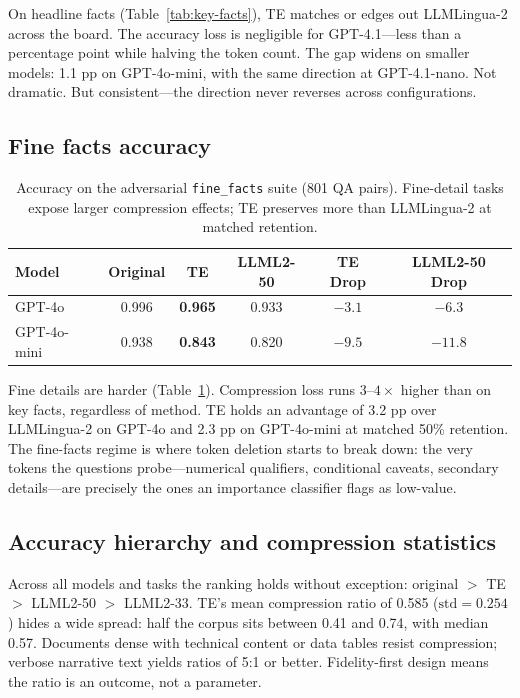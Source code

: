 \documentclass{article}
\begin{document}
On headline facts (Table~\ref{tab:key-facts}), TE matches or edges out LLMLingua-2 across the board. The accuracy loss is negligible for GPT-4.1---less than a percentage point while halving the token count. The gap widens on smaller models: 1.1 pp on GPT-4o-mini, with the same direction at GPT-4.1-nano. Not dramatic. But consistent---the direction never reverses across configurations.

\subsection{Fine facts accuracy}

\begin{table}[h]
  \caption{Accuracy on the adversarial \texttt{fine\_facts} suite (801 QA pairs). Fine-detail tasks expose larger compression effects; TE preserves more than LLMLingua-2 at matched retention.}
  \label{tab:fine-facts}
  \centering
  \small
  \begin{tabular}{lccccc}
    \toprule
    Model & Original & TE & LLML2-50 & TE Drop & LLML2-50 Drop \\
    \midrule
    GPT-4o      & 0.996 & \textbf{0.965} & 0.933 & $-3.1$ & $-6.3$ \\
    GPT-4o-mini & 0.938 & \textbf{0.843} & 0.820 & $-9.5$ & $-11.8$ \\
    \bottomrule
  \end{tabular}
\end{table}

Fine details are harder (Table~\ref{tab:fine-facts}). Compression loss runs $3$--$4\times$ higher than on key facts, regardless of method. TE holds an advantage of 3.2 pp over LLMLingua-2 on GPT-4o and 2.3 pp on GPT-4o-mini at matched 50\% retention. The fine-facts regime is where token deletion starts to break down: the very tokens the questions probe---numerical qualifiers, conditional caveats, secondary details---are precisely the ones an importance classifier flags as low-value.

\subsection{Accuracy hierarchy and compression statistics}

Across all models and tasks the ranking holds without exception: original $>$ TE $>$ LLML2-50 $>$ LLML2-33. TE's mean compression ratio of 0.585 ($\textrm{std}=0.254$) hides a wide spread: half the corpus sits between 0.41 and 0.74, with median 0.57. Documents dense with technical content or data tables resist compression; verbose narrative text yields ratios of 5:1 or better. Fidelity-first design means the ratio is an outcome, not a parameter.
\end{document}
